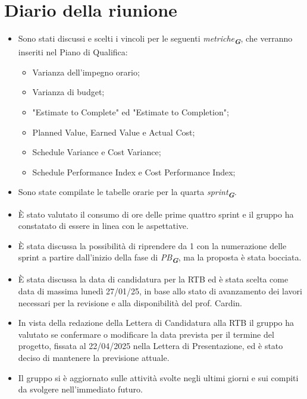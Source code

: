 
\section{Diario della riunione}

\begin{itemize}
    \item Sono stati discussi e scelti i vincoli per le seguenti \emph{metriche}\textsubscript{\textit{\textbf{G}}}, che verranno inseriti nel Piano di Qualifica:
    \begin{itemize}
        \item Varianza dell'impegno orario;
        \item Varianza di budget;
        \item "Estimate to Complete" ed "Estimate to Completion";
        \item Planned Value, Earned Value e Actual Cost;
        \item Schedule Variance e Cost Variance;
        \item Schedule Performance Index e Cost Performance Index;
    \end{itemize}
    \item Sono state compilate le tabelle orarie per la quarta \emph{sprint}\textsubscript{\textit{\textbf{G}}}.
    \item È stato valutato il consumo di ore delle prime quattro sprint e il gruppo ha constatato di essere in linea con le aspettative.
    \item È stata discussa la possibilità di riprendere da 1 con la numerazione delle sprint a partire dall'inizio della fase di \emph{PB}\textsubscript{\textit{\textbf{G}}},
    ma la proposta è stata bocciata.
    \item È stata discussa la data di candidatura per la RTB ed è stata scelta come data di massima lunedì 27/01/25,
    in base allo stato di avanzamento dei lavori necessari per la revisione e alla disponibilità del prof. Cardin.
    \item In vista della redazione della Lettera di Candidatura alla RTB il gruppo ha valutato se confermare o modificare la data prevista per il termine del progetto,
    fissata al 22/04/2025 nella Lettera di Presentazione, ed è stato deciso di mantenere la previsione attuale.
    \item Il gruppo si è aggiornato sulle attività svolte negli ultimi giorni e sui compiti da svolgere nell'immediato futuro.
 \end{itemize}
